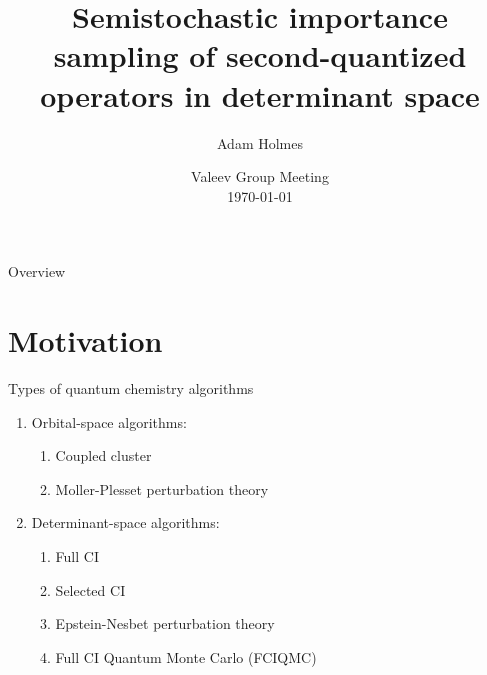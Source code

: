 \documentclass[amsmath]{beamer}
\begin{document}
	\title[Semistochastic importance sampling]{Semistochastic importance sampling of second-quantized operators in determinant space}
	\author[A. Holmes]{Adam Holmes}
	\date{Valeev Group Meeting\\\today} 
	
	\frame{\titlepage} 
	
	\begin{frame}{Overview}
		\tableofcontents[hideallsubsections]
	\end{frame}

\section{Motivation}
\begin{frame}{Types of quantum chemistry algorithms}
	\begin{enumerate}
		\item Orbital-space algorithms:
		\begin{enumerate}
			\item Coupled cluster
			\item Moller-Plesset perturbation theory
			\linebreak
		\end{enumerate}
		\item Determinant-space algorithms:
		\begin{enumerate}
			\item Full CI
			\item Selected CI
			\item Epstein-Nesbet perturbation theory
			\item Full CI Quantum Monte Carlo (FCIQMC)
		\end{enumerate}
	\end{enumerate}
\end{frame}

\end{document}
